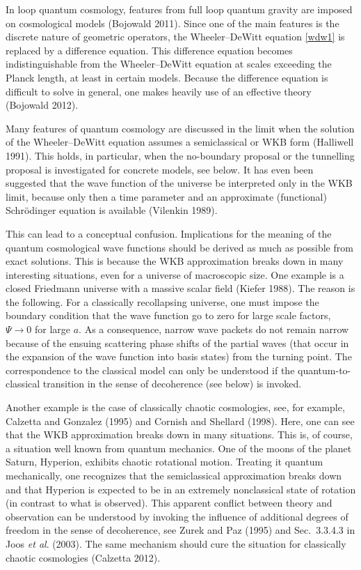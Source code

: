 \documentclass[12pt]{article}
\begin{document}
In loop quantum cosmology, features from full loop quantum gravity are
imposed on cosmological models (Bojowald 2011).
Since one of the main features is the discrete nature of geometric
operators, the Wheeler--DeWitt equation \eqref{wdw1} is replaced by a
difference equation. This difference equation becomes
indistinguishable from the Wheeler--DeWitt equation at scales
exceeding the Planck length, at least in certain models. Because the
difference equation is difficult to solve in general, one makes
heavily use of an effective theory (Bojowald 2012).

Many features of quantum cosmology are discussed in the limit when
the solution of the Wheeler--DeWitt equation assumes a semiclassical
or WKB form (Halliwell 1991). This holds, in particular, when the
no-boundary proposal or the tunnelling proposal is investigated for
concrete models, see below. It has even been suggested that the wave function of
the universe be interpreted only in the WKB limit, because only then a
time parameter and an approximate (functional) Schr\"odinger equation
is available (Vilenkin 1989). 

This can lead to a conceptual confusion. Implications for the meaning of
the quantum cosmological wave functions should be derived as much as
possible from exact solutions. This is because the WKB approximation
breaks down in many interesting situations, even for a universe of
macroscopic size. One example is a closed Friedmann universe with a massive
scalar field (Kiefer 1988). The reason is the following. For a
classically recollapsing universe, one must impose the boundary
condition that the wave function go to zero for large scale factors,
$\Psi\to0$ for large $a$. As a consequence, narrow wave packets do not
remain narrow because of the ensuing scattering phase shifts of the
partial waves (that occur in the expansion of the wave function 
into basis states) from the turning point. The correspondence to the
classical model can only be understood if the quantum-to-classical
transition in the sense of decoherence (see below) is invoked.  

Another example is the case of classically chaotic cosmologies, see,
for example, Calzetta and Gonzalez (1995) and Cornish and Shellard
(1998). Here, one can see that the WKB approximation breaks down in
many situations. This is, of course, a situation well known from
quantum mechanics. One of the moons of the planet Saturn, Hyperion,
exhibits chaotic rotational motion. Treating it quantum mechanically,
one recognizes that the semiclassical approximation breaks down and
that Hyperion is expected to be in an extremely nonclassical state of
rotation (in contrast to what is observed). This apparent conflict
between theory and observation can be understood by invoking the
influence of additional degrees of freedom in the sense of
decoherence, see Zurek and Paz (1995) and Sec.~3.3.4.3 in Joos {\em et
  al}. (2003). The same mechanism should cure the situation
for classically chaotic cosmologies (Calzetta 2012). 
\end{document}
